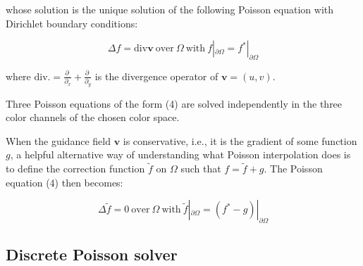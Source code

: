 \documentclass{article}
\begin{document}
whose solution is the unique solution of the following Poisson equation with Dirichlet boundary conditions:

\begin{equation}
    \Delta f = \text{div}\mathbf{v} \ \text{over} \ \Omega \ \text{with} \ f|_{\partial \Omega} = f^*|_{\partial \Omega}
\end{equation}

where $\text{div} . = \frac{\partial_.}{\partial_x} + \frac{\partial_.}{\partial_y}$ is the divergence operator of $\mathbf{v} = (u, v)$. 

Three Poisson equations of the form (4) are solved independently in the three color channels of the chosen color space.


When the guidance field $\mathbf{v}$ is conservative, i.e., it is the gradient of some function $g$, a helpful alternative way of understanding what Poisson interpolation does is to define the correction function $\tilde{f}$ on $\Omega$ such that $f = \tilde{f} + g$. The Poisson equation (4) then becomes:

\begin{equation}
    \Delta \tilde{f} = 0 \ \text{over} \ \Omega \ \text{with} \ \tilde{f}|_{\partial \Omega} = (f^* - g) |_ {\partial \Omega}
\end{equation}

\subsection*{Discrete Poisson solver}
\end{document}
